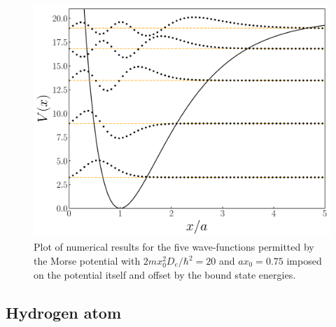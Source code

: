 \begin{figure}[h!tb]
    \centering
    \includegraphics[width=0.5\linewidth]{morse_wfs.pdf}
    \caption{Plot of numerical results for the five wave-functions permitted by the Morse potential with $2 m x_0^2 D_{e} / \hbar^2 = 20$ and $a x_0 = 0.75$ imposed on the potential itself and offset by the bound state energies.}
    \label{fig:morse-wfs}
\end{figure}



\subsection{Hydrogen atom}
\label{ssec:hydrogen-atom}

